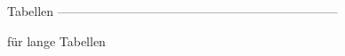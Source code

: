 \usepackage[ngerman]{babel}
\usepackage[T1]{fontenc} %
\usepackage{textcomp} %
\usepackage{newtx} %

Tabellen --------------------------------------------------------------------
\usepackage{tabularx}
für lange Tabellen
\usepackage{longtable}
\usepackage{array}
\usepackage{ragged2e}
\usepackage{lscape}

\usepackage{graphicx}
\usepackage{graphics}
\usepackage{floatflt} %

\usepackage{xspace} %

\usepackage[printonlyused]{acronym} %

\usepackage{setspace}
\usepackage{geometry}

\usepackage[intoc]{nomencl}
\let\abbrev\nomenclature
\setlength{\nomlabelwidth}{.25\hsize}
\renewcommand{\nomlabel}[1]{#1 \dotfill}
\setlength{\nomitemsep}{-\parsep}

\usepackage{varioref} %
\usepackage{chngcntr} %
\usepackage{ifthen} %
\setlength{\marginparwidth }{2cm} %
\usepackage{todonotes} %
\usepackage{natbib} %

\usepackage{xcolor}



